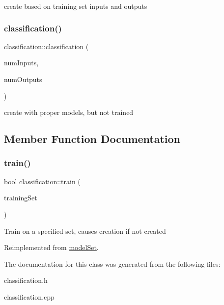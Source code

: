 create based on training set inputs and outputs \mbox{\label{classclassification_ab76d1e8c617be54ede9ea47dd3c128bf}} 
\subsubsection{\texorpdfstring{classification()}{classification()}\hspace{0.1cm}{\footnotesize\ttfamily [3/3]}}
{\footnotesize\ttfamily classification\+::classification (\begin{DoxyParamCaption}\item[{int}]{num\+Inputs,  }\item[{int}]{num\+Outputs }\end{DoxyParamCaption})}

create with proper models, but not trained 

\subsection{Member Function Documentation}
\mbox{\label{classclassification_a8e834c25309bc471c5bb8e8730874c82}} 
\subsubsection{\texorpdfstring{train()}{train()}}
{\footnotesize\ttfamily bool classification\+::train (\begin{DoxyParamCaption}\item[{std\+::vector$<$ \hyperlink{structtraining_example}{training\+Example} $>$}]{training\+Set }\end{DoxyParamCaption})\hspace{0.3cm}{\ttfamily [virtual]}}

Train on a specified set, causes creation if not created 

Reimplemented from \hyperlink{classmodel_set_ab0b16ec988c8077158de1c3d8986df03}{model\+Set}.



The documentation for this class was generated from the following files\+:\begin{DoxyCompactItemize}
\item 
classification.\+h\item 
classification.\+cpp\end{DoxyCompactItemize}
